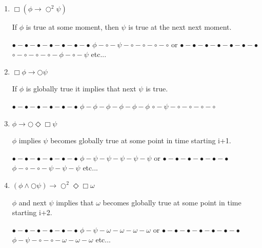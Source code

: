 \documentclass[12pt]{article}
\begin{document}
\begin{enumerate}

	\item $\Box (\phi \rightarrow \bigcirc^{2} \psi)$
	
	If $\phi$ is true at some moment, then $\psi$ is true at the next 		next moment.
	
	$\bullet-\bullet-\bullet-\bullet-\bullet-\bullet-\bullet$ \newline
	$\phi-\circ-\psi-\circ-\circ-\circ-\circ$ \newline
	or \newline
	$\bullet-\bullet-\bullet-\bullet-\bullet-\bullet-\bullet$ \newline
	$\circ-\circ-\circ-\circ-\phi-\circ-\psi$ \newline
	etc... 

	\item $\Box \phi \rightarrow \bigcirc \psi$
	
	If $\phi$ is globally true it implies that next $\psi$ is true.
	
	$\bullet-\bullet-\bullet-\bullet-\bullet-\bullet$ \newline
	$\phi-\phi-\phi-\phi-\phi-\phi$ \newline
	$\circ-\psi-\circ-\circ-\circ-\circ$
	
	\item $\phi \rightarrow \bigcirc \Diamond \Box \psi$
	
	$\phi$ implies $\psi$ becomes globally true at some point in time starting i+1.
	
	$\bullet-\bullet-\bullet-\bullet-\bullet-\bullet$ \newline
	$\phi-\psi-\psi-\psi-\psi-\psi$ \newline
	or \newline
	$\bullet-\bullet-\bullet-\bullet-\bullet-\bullet$ \newline
	$\phi-\circ-\circ-\psi-\psi-\psi$ \newline
	etc...
	
	\item $(\phi \wedge \bigcirc \psi) \rightarrow \bigcirc^{2} \Diamond \Box \omega$
	
	$\phi$ and next $\psi$ implies that $\omega$ becomes globally true at some point in time starting i+2.
	
	$\bullet-\bullet-\bullet-\bullet-\bullet-\bullet$ \newline
	$\phi-\psi-\omega-\omega-\omega-\omega$ \newline
	or \newline
	$\bullet-\bullet-\bullet-\bullet-\bullet-\bullet-\bullet$ \newline
	$\phi-\psi-\circ-\circ-\omega-\omega-\omega$ \newline
	etc...
	

\end{enumerate}
\end{document}
